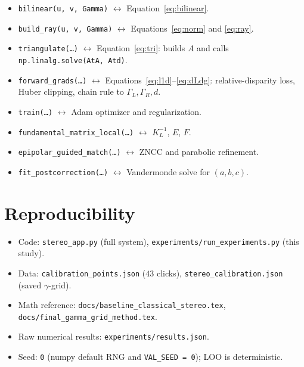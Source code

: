 \documentclass[11pt]{article}
\begin{document}
\begin{itemize}[leftmargin=2em]
  \item \texttt{bilinear(u, v, Gamma)} $\leftrightarrow$ Equation~\eqref{eq:bilinear}.
  \item \texttt{build\_ray(u, v, Gamma)} $\leftrightarrow$ Equations~\eqref{eq:norm} and \eqref{eq:ray}.
  \item \texttt{triangulate(\dots)} $\leftrightarrow$ Equation~\eqref{eq:tri}: builds $A$ and calls \texttt{np.linalg.solve(AtA, Atd)}.
  \item \texttt{forward\_grads(\dots)} $\leftrightarrow$ Equations~\eqref{eq:l1d}--\eqref{eq:dLdg}: relative-disparity loss, Huber clipping, chain rule to $\Gamma_L, \Gamma_R, d$.
  \item \texttt{train(\dots)} $\leftrightarrow$ Adam optimizer and regularization.
  \item \texttt{fundamental\_matrix\_local(\dots)} $\leftrightarrow$ $K_L^{-1}$, $E$, $F$.
  \item \texttt{epipolar\_guided\_match(\dots)} $\leftrightarrow$ ZNCC and parabolic refinement.
  \item \texttt{fit\_postcorrection(\dots)} $\leftrightarrow$ Vandermonde solve for $(a, b, c)$.
\end{itemize}

\section*{Reproducibility}

\begin{itemize}[leftmargin=2em]
  \item Code: \texttt{stereo\_app.py} (full system), \texttt{experiments/run\_experiments.py} (this study).
  \item Data: \texttt{calibration\_points.json} ($43$ clicks), \texttt{stereo\_calibration.json} (saved $\gamma$-grid).
  \item Math reference: \texttt{docs/baseline\_classical\_stereo.tex}, \texttt{docs/final\_gamma\_grid\_method.tex}.
  \item Raw numerical results: \texttt{experiments/results.json}.
  \item Seed: \texttt{0} (numpy default RNG and \texttt{VAL\_SEED = 0}); LOO is deterministic.
\end{itemize}
\end{document}
